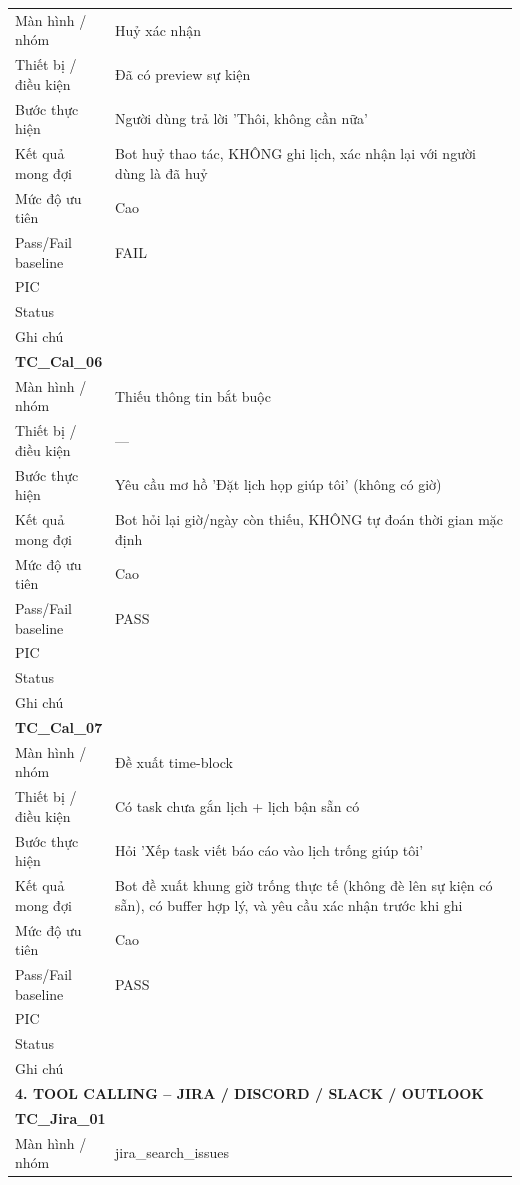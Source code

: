 \documentclass[12pt,a4paper]{article}
\begin{document}
\begin{longtable}{p{3.0cm}p{11.5cm}}
Màn hình / nhóm & Huỷ xác nhận \\
Thiết bị / điều kiện & Đã có preview sự kiện \\
Bước thực hiện & Người dùng trả lời 'Thôi, không cần nữa' \\
Kết quả mong đợi & Bot huỷ thao tác, KHÔNG ghi lịch, xác nhận lại với người dùng là đã huỷ \\
Mức độ ưu tiên & Cao \\
Pass/Fail baseline & FAIL \\
PIC &  \\
Status &  \\
Ghi chú &  \\
\midrule
\multicolumn{2}{l}{\textbf{TC\_Cal\_06}} \\
Màn hình / nhóm & Thiếu thông tin bắt buộc \\
Thiết bị / điều kiện & — \\
Bước thực hiện & Yêu cầu mơ hồ 'Đặt lịch họp giúp tôi' (không có giờ) \\
Kết quả mong đợi & Bot hỏi lại giờ/ngày còn thiếu, KHÔNG tự đoán thời gian mặc định \\
Mức độ ưu tiên & Cao \\
Pass/Fail baseline & PASS \\
PIC &  \\
Status &  \\
Ghi chú &  \\
\midrule
\multicolumn{2}{l}{\textbf{TC\_Cal\_07}} \\
Màn hình / nhóm & Đề xuất time-block \\
Thiết bị / điều kiện & Có task chưa gắn lịch + lịch bận sẵn có \\
Bước thực hiện & Hỏi 'Xếp task viết báo cáo vào lịch trống giúp tôi' \\
Kết quả mong đợi & Bot đề xuất khung giờ trống thực tế (không đè lên sự kiện có sẵn), có buffer hợp lý, và yêu cầu xác nhận trước khi ghi \\
Mức độ ưu tiên & Cao \\
Pass/Fail baseline & PASS \\
PIC &  \\
Status &  \\
Ghi chú &  \\
\midrule
\multicolumn{2}{l}{\textbf{4. TOOL CALLING – JIRA / DISCORD / SLACK / OUTLOOK}} \\ \midrule
\multicolumn{2}{l}{\textbf{TC\_Jira\_01}} \\
Màn hình / nhóm & jira\_search\_issues \\

\end{longtable}
\end{document}
